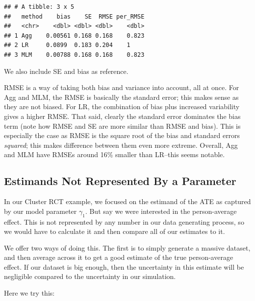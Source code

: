 \documentclass[
]{book}
\newenvironment{Shaded}{\begin{snugshade}}{\end{snugshade}}
\newcommand{\AttributeTok}[1]{\textcolor[rgb]{0.13,0.29,0.53}{#1}}
\newcommand{\DecValTok}[1]{\textcolor[rgb]{0.00,0.00,0.81}{#1}}
\newcommand{\FloatTok}[1]{\textcolor[rgb]{0.00,0.00,0.81}{#1}}
\newcommand{\FunctionTok}[1]{\textcolor[rgb]{0.13,0.29,0.53}{\textbf{#1}}}
\newcommand{\NormalTok}[1]{#1}
\newcommand{\OtherTok}[1]{\textcolor[rgb]{0.56,0.35,0.01}{#1}}
\newcommand{\SpecialCharTok}[1]{\textcolor[rgb]{0.81,0.36,0.00}{\textbf{#1}}}
\begin{document}
\begin{verbatim}
## # A tibble: 3 x 5
##   method    bias    SE  RMSE per_RMSE
##   <chr>    <dbl> <dbl> <dbl>    <dbl>
## 1 Agg    0.00561 0.168 0.168    0.823
## 2 LR     0.0899  0.183 0.204    1    
## 3 MLM    0.00788 0.168 0.168    0.823
\end{verbatim}

We also include SE and bias as reference.

RMSE is a way of taking both bias and variance into account, all at once.
For Agg and MLM, the RMSE is basically the standard error; this makes sense as they are not biased.
For LR, the combination of bias plus increased variability gives a higher RMSE.
That said, clearly the standard error dominates the bias term (note how RMSE and SE are more similar than RMSE and bias).
This is especially the case as RMSE is the square root of the bias and standard errors \emph{squared}; this makes difference between them even more extreme.
Overall, Agg and MLM have RMSEs around 16\% smaller than LR--this seems notable.

\subsection{Estimands Not Represented By a Parameter}\label{estimands-not-represented-by-a-parameter}

In our Cluster RCT example, we focused on the estimand of the ATE as captured by our model parameter \(\gamma_1\).
But say we were interested in the person-average effect.
This is not represented by any number in our data generating process, so we would have to calculate it and then compare all of our estimates to it.

We offer two ways of doing this.
The first is to simply generate a massive dataset, and then average across it to get a good estimate of the true person-average effect.
If our dataset is big enough, then the uncertainty in this estimate will be negligible compared to the uncertainty in our simulation.

Here we try this:

\begin{Shaded}
\end{Shaded}
\end{document}
